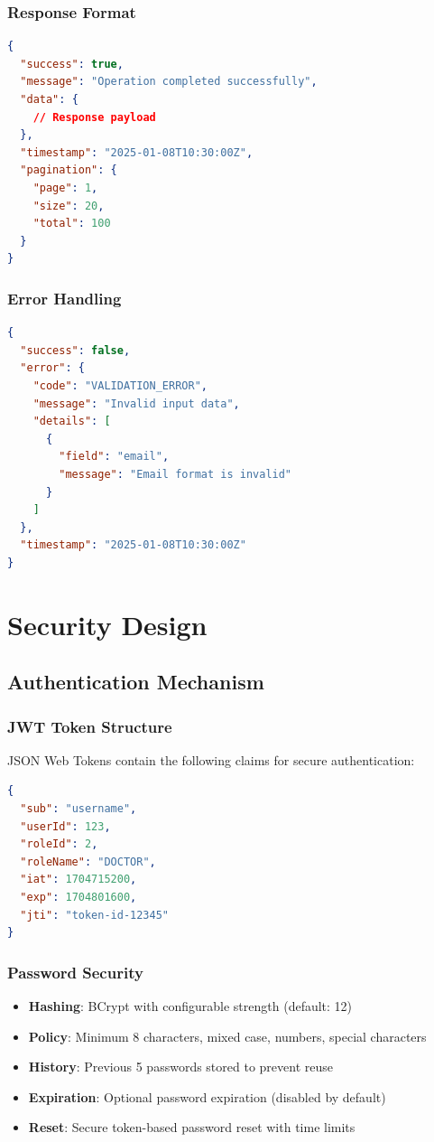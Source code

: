 \documentclass[12pt,a4paper]{article}
\begin{document}
\subsubsection{Response Format}
\begin{lstlisting}[language=JSON]
{
  "success": true,
  "message": "Operation completed successfully",
  "data": {
    // Response payload
  },
  "timestamp": "2025-01-08T10:30:00Z",
  "pagination": {
    "page": 1,
    "size": 20,
    "total": 100
  }
}
\end{lstlisting}

\subsubsection{Error Handling}
\begin{lstlisting}[language=JSON]
{
  "success": false,
  "error": {
    "code": "VALIDATION_ERROR",
    "message": "Invalid input data",
    "details": [
      {
        "field": "email",
        "message": "Email format is invalid"
      }
    ]
  },
  "timestamp": "2025-01-08T10:30:00Z"
}
\end{lstlisting}

\section{Security Design}

\subsection{Authentication Mechanism}

\subsubsection{JWT Token Structure}
JSON Web Tokens contain the following claims for secure authentication:

\begin{lstlisting}[language=JSON]
{
  "sub": "username",
  "userId": 123,
  "roleId": 2,
  "roleName": "DOCTOR",
  "iat": 1704715200,
  "exp": 1704801600,
  "jti": "token-id-12345"
}
\end{lstlisting}

\subsubsection{Password Security}
\begin{itemize}
    \item \textbf{Hashing}: BCrypt with configurable strength (default: 12)
    \item \textbf{Policy}: Minimum 8 characters, mixed case, numbers, special characters
    \item \textbf{History}: Previous 5 passwords stored to prevent reuse
    \item \textbf{Expiration}: Optional password expiration (disabled by default)
    \item \textbf{Reset}: Secure token-based password reset with time limits
\end{itemize}
\end{document}
